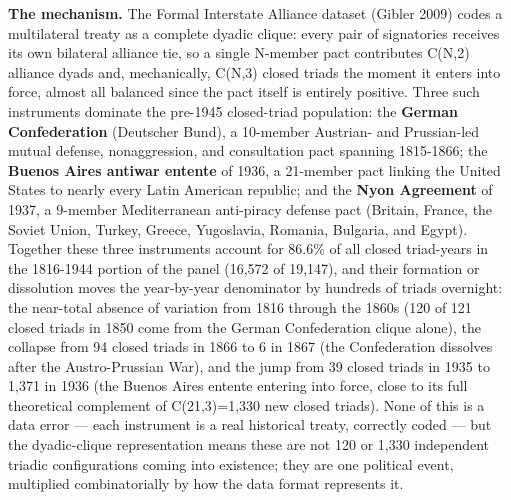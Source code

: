 \documentclass[Afour,sageh,times,doublespace]{sagej}
\begin{document}
\textbf{The mechanism.} The Formal Interstate Alliance dataset (Gibler 2009) codes a multilateral treaty as a complete dyadic clique: every pair of signatories receives its own bilateral alliance tie, so a single N-member pact contributes C(N,2) alliance dyads and, mechanically, C(N,3) closed triads the moment it enters into force, almost all balanced since the pact itself is entirely positive. Three such instruments dominate the pre-1945 closed-triad population: the \textbf{German Confederation} (Deutscher Bund), a 10-member Austrian- and Prussian-led mutual defense, nonaggression, and consultation pact spanning 1815-1866; the \textbf{Buenos Aires antiwar entente} of 1936, a 21-member pact linking the United States to nearly every Latin American republic; and the \textbf{Nyon Agreement} of 1937, a 9-member Mediterranean anti-piracy defense pact (Britain, France, the Soviet Union, Turkey, Greece, Yugoslavia, Romania, Bulgaria, and Egypt). Together these three instruments account for 86.6\% of all closed triad-years in the 1816-1944 portion of the panel (16,572 of 19,147), and their formation or dissolution moves the year-by-year denominator by hundreds of triads overnight: the near-total absence of variation from 1816 through the 1860s (120 of 121 closed triads in 1850 come from the German Confederation clique alone), the collapse from 94 closed triads in 1866 to 6 in 1867 (the Confederation dissolves after the Austro-Prussian War), and the jump from 39 closed triads in 1935 to 1,371 in 1936 (the Buenos Aires entente entering into force, close to its full theoretical complement of C(21,3)=1,330 new closed triads). None of this is a data error --- each instrument is a real historical treaty, correctly coded --- but the dyadic-clique representation means these are not 120 or 1,330 independent triadic configurations coming into existence; they are one political event, multiplied combinatorially by how the data format represents it.
\end{document}
